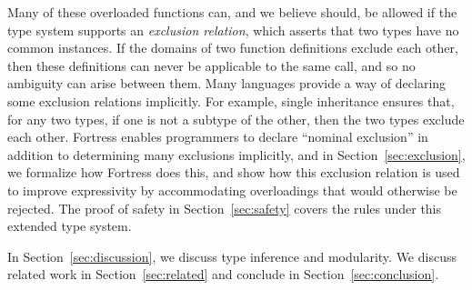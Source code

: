 Many of these overloaded functions can, 
and we believe should, 
be allowed 
if the type system supports an \emph{exclusion relation},
which asserts that two types have no common instances.
If the domains of two function definitions exclude each other, 
then these definitions can never be applicable to the same call,
and so no ambiguity can arise between them.
Many languages provide a way of declaring some exclusion relations
implicitly. For example, single inheritance ensures that, for any 
two types, if one is not a subtype of the other, then the two types exclude each other.
Fortress enables programmers to declare ``nominal exclusion''
in addition to determining many exclusions implicitly, 
and in Section~\ref{sec:exclusion}, 
we formalize how Fortress does this, 
and show how this exclusion relation is used 
to improve expressivity 
by accommodating overloadings that would otherwise be rejected.
The proof of safety in Section~\ref{sec:safety} 
covers the rules under this extended type system.

In Section~\ref{sec:discussion}, we discuss type inference and modularity.
We discuss related work in Section~\ref{sec:related} and
conclude in Section~\ref{sec:conclusion}.

